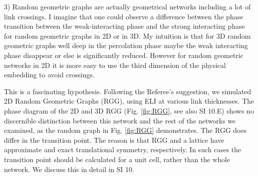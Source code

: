 \documentclass[11pt]{article}
\newcommand{\outNim}[1]{}
\begin{document}
\begin{response}{
3) Random geometric graphs are actually geometrical networks including a lot of link crossings. I imagine that one could observe a difference between the phase transition between the weak-interacting phase and the strong interacting phase for random geometric graphs in 2D or in 3D. My intuition is that for 3D random geometric graphs well deep in the percolation phase maybe the weak interacting phase disappear or else is significantly reduced. However for random geometric networks in 2D it is more easy to use the third dimension of the physical embedding to avoid crossings. 
}

This is a fascinating hypothesis. 
Following the Referee's suggestion, we simulated 2D Random Geometric Graphs (RGG), using ELI at various link thicknesses. 
The phase diagram of the 2D and 3D RGG (Fig. \ref{fig:RGG}, see also SI 10.E) shows no discernible distinction between this network and the rest of the networks we examined, as the random graph in Fig. \ref{fig:RGG} demonstrates.
The RGG does differ in the transition point. 
The reason is that RGG and a lattice have approximate and exact translational symmetry, respectively.
In such cases the transition point should be calculated for a unit cell, rather than the whole network. 
We discuss this in detail in SI 10. 

\outNim{
\color{red} 
Note that a random geometric graph (RGG) in 3D shares some characteristics of a force-directed layout (FDL) of an Erd\"os-Renyi (ER) random graph: 
1) in both networks nodes have a peaked degree distribution, thus most nodes have comparable degrees and have similar density of links around them; 2) in FDL connected nodes are on average closer to each other than disconnected nodes, similar to an RGG.
One can argue that any ER graph is a RGG in $N-1$ dimensional space. 
Since our analysis shows that (Eq.(4)) the density of links is the important factor in the phase transition, we expect 3D RGG to behave similar to ER. 
}


\end{response}
\end{document}
